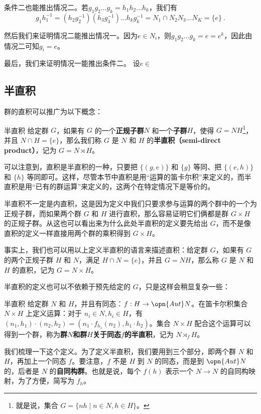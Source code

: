 条件二也能推出情况二。若$g_1g_2...g_k=h_1h_2...h_k$，我们有
\begin{equation}
g_1h_1^{-1}=(h_2g_2^{-1})(h_3g_3^{-1})...h_kg_k^{-1}=N_1\cap N_2N_3...N_K=\{e\}~.
\end{equation}

然后我们来证明情况二能推出情况一。因为$e\in N_i$，则$g_1g_2...g_k=e=e^k$，因此由情况二可知$g_i=e$。

最后，我们来证明情况一能推出条件二。
设$e\in $




\subsection{半直积}

群的直积可以推广为以下概念：

\begin{definition}{半直积}
给定群 $G$，如果有 $G$ 的一个\textbf{正规子群}$N$ 和一个\textbf{子群}$H$，使得 $G = N H$\footnote{就是说，集合 $G= \{n h \mid n \in N, h\in H\}$。}，并且 $N \cap H = \{e\}$，那么我们称 $G$ 是 $N$ 和 $H$ 的\textbf{半直积（semi-direct product）}，记为 $G = N \rtimes H$。
\end{definition}

可以注意到，直积是半直积的一种，只要把 $\{(g, e)\}$ 和 $\{g\}$ 等同、把 $\{(e, h)\}$ 和 $\{h\}$ 等同即可。这样，尽管本节中直积是用“运算的笛卡尔积”来定义的，而半直积是用“已有的群运算”来定义的，这两个在特定情况下是等价的。

半直积不一定是内直积，这是因为定义中我们只要求参与运算的两个群中的一个为正规子群，而如果两个群 $G$ 和 $H$ 进行直积，那么容易证明它们俩都是群 $G\times H$ 的正规子群。从这也可以看出来为什么此处半直积的定义要先给出 $G$，而不是像直积的定义一样直接用两个群的乘积得到 $G\times H$。

事实上，我们也可以用以上定义半直积的语言来描述直积：给定群 $G$，如果有 $G$ 的两个正规子群 $H$ 和 $N$，满足 $H\cap N=\{e\}$，并且 $G=NH$，那么称 $G$ 是 $N$ 和 $H$ 的直积，记为 $G=N\times H$。

半直积的定义也可以不依赖于预先给定的 $G$，只是这样会稍显复杂一些：

\begin{definition}{半直积}
给定群 $N$ 和 $H$，并且有同态：$f:H\rightarrow \opn{Aut}N$。在笛卡尔积集合 $N\times H$ 上定义运算：对于 $n_i\in N, h_i\in H$，有 $(n_1, h_1)\cdot(n_2, h_2)=(n_1\cdot f_{h_1}(n_2), h_1\cdot h_2)$。集合 $N\times H$ 配合这个运算可以得到一个群，称为\textbf{群}$N$\textbf{和群}$H$\textbf{关于同态}$f$\textbf{的半直积}，记为 $N\rtimes_fH$。
\end{definition}

我们梳理一下这个定义。为了定义半直积，我们要用到三个部分，即两个群 $N$ 和 $H$，再加上一个同态 $f$。要注意，$f$ 不是 $H$ 到 $N$ 的同态，而是到 $\opn{Aut} N$ 的，后者是 $N$ 的\textbf{自同构群}。也就是说，每个 $f(h)$ 表示一个 $N\rightarrow N$ 的自同构映射，为了方便，简写为 $f_h$。













